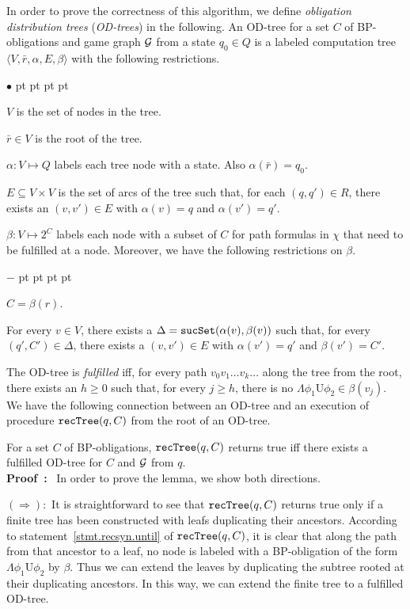 \documentclass[11pt]{article}
\newcommand{\ttsynsuc}{\mbox{\tt sucSet}}
\newcommand{\ttrecsyn}{\mbox{\tt recTree}}
\newcommand{\calg}{{\cal G}}
\newcommand{\pf}{\noindent\mbox{\bf Proof : }}
\newcommand{\until}{\textrm{U}} %
\newenvironment{list1}{\begin{list}{$\bullet$}
{\topsep 0 pt \parsep 0 pt \partopsep 0 pt \itemsep 0 pt}}{\end{list}}
\newenvironment{list2}{\begin{list}{$-$}
{\topsep 0 pt \parsep 0 pt \partopsep 0 pt \itemsep 0 pt}}{\end{list}}
\begin{document}
In order to prove the correctness of this algorithm,
we define {\em obligation distribution trees} ({\em OD-trees})
in the following.
An OD-tree for a set $C$ of BP-obligations and
game graph $\calg$
from a state $q_0\in Q$ is a labeled computation tree
$\langle V,\bar{r},\alpha,E,\beta\rangle$ with
the following restrictions.
\begin{list1}
\item $V$ is the set of nodes in the tree.
\item $\bar{r}\in V$ is the root of the tree.
\item $\alpha:V\mapsto Q$ labels each tree node with a state.
\label{reply2.correct.g2q} 
    Also $\alpha(\bar{r})=q_0$.
\item $E\subseteq V\times V$ is the set of arcs of the tree
    such that, for each $(q,q')\in R$,
    there exists an $(v,v')\in E$ with $\alpha(v)=q$ and $\alpha(v')=q'$.
\item $\beta:V\mapsto 2^C$ labels
    each node with a subset of $C$ for path formulas in $\chi$
    that need to be fulfilled at a node.  
    Moreover, we have the following restrictions on $\beta$.
    \begin{list2}
    \item $C= \beta(r)$.\label{reply2.C.eq.betar}  
    \item For every $v\in V$,
        there exists a 
        $\Delta=\ttsynsuc(\alpha(v),\beta(v))$
        such that,
        for every $(q',C')\in \Delta$,
        there exists a $(v,v')\in E$ with
        $\alpha(v')=q'$ and $\beta(v')=C'$.
    \end{list2}
\end{list1}
The OD-tree is {\em fulfilled} iff, for every
path $v_0v_1\ldots v_k\ldots$ along the tree from the root,
there exists an $h\geq 0$ such that,
for every $j\geq h$, there is no $\Lambda\phi_1\until\phi_2\in \beta(v_j)$.  
We have the following connection between an OD-tree and an
execution of procedure
\mbox{$\ttrecsyn(q,C)$}
from the root of an OD-tree.

{\lemma \label{lemma.rectree.sitree}
For a set $C$ of BP-obligations, 
$\ttrecsyn(q,C)$ returns true iff
there exists a fulfilled OD-tree for $C$ and $\calg$ from $q$.
}\\\pf 
In order to prove the lemma, we show both directions.

\noindent $(\Rightarrow):$
It is straightforward to see that $\ttrecsyn(q,C)$
returns true only if a finite tree has been constructed
with leafs duplicating their ancestors.
According to statement~\ref{stmt.recsyn.until} of $\ttrecsyn(q,C)$,
it is clear that along the path from that ancestor to a leaf, no
node is labeled with a BP-obligation of the form $\Lambda\phi_1\until\phi_2$ 
by $\beta$.
Thus we can extend the leaves by duplicating the subtree rooted
at their duplicating ancestors.
In this way, we can extend the finite tree to a fulfilled OD-tree.
\end{document}
